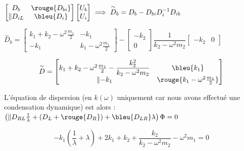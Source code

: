 \documentclass[12pt,a4paper]{article}
\begin{document}
\begin{sol}
\begin{enumerate}
			$\left[\begin{matrix}
				D_b & \rouge{D_{bi}}\\
				\Vert{D_{iL}} & \bleu{D_i}
			\end{matrix}\right]\left[\begin{matrix}
				U_b \\ U_i
			\end{matrix}\right] \implies \overset\sim D_b = D_b - D_{bi}D_i^{-1} D_{ib}$\\
			
			\begin{minipage}[t]{18.5cm}
				$\overset\sim D_b = \left[\begin{matrix}
					k_1+k_2-\omega^2\frac{m_1}2 & -k_1 \\
					-k_1 & k_1 - \omega^2\frac{m_1}2
				\end{matrix}\right]-\left[\begin{matrix}
					-k_2 \\ 0
				\end{matrix}\right]\dfrac{1}{k_2-\omega^2m_ 2}\left[\begin{matrix}
					-k_2 & 0
				\end{matrix}\right]$
			\end{minipage}
			
			\[
			\overset\sim D = \left[\begin{matrix}
				k_1+k_2-\omega^2\frac{m_1}2-\dfrac{k_2^2}{k_2-\omega^2m_2} & \bleu{k_1}\\
				\Vert{-k_1} & \rouge{k_1-\omega^2 \frac{m_1}2}
			\end{matrix}\right]
			\]
			
			\begin{minipage}[t]{16cm}
				L'équation de dispersion (en $k(\omega)$ uniquement car nous avons effectué une condensation dynamique) est alors : $\left(\Vert{D_{RL}}\frac1\lambda + (D_L+\rouge{D_R})+\bleu{D_{LR}}\lambda\right)\Phi = 0$
			\end{minipage}
			
			\[
			-k_1(\frac1\lambda + \lambda) +2k_1 + k_2 +\dfrac{k_2}{k_2-\omega^2m_2}-\omega^2m_1 = 0
			\]
		\end{enumerate}
	\end{sol}
	
\end{document}
